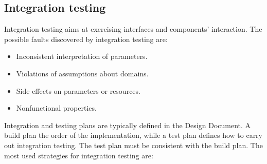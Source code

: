 \subsection{Integration testing}
Integration testing aims at exercising interfaces and components' interaction. 
The possible faults discovered by integration testing are: 
\begin{itemize}
    \item Inconsistent interpretation of parameters.
    \item Violations of assumptions about domains.
    \item Side effects on parameters or resources.
    \item Nonfunctional properties.
\end{itemize}
Integration and testing plans are typically defined in the Design Document. 
A build plan the order of the implementation, while a test plan defines how to carry out integration testing.
The test plan must be consistent with the build plan. 
The most used strategies for integration testing are: 
